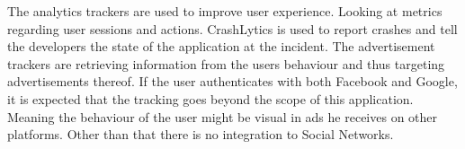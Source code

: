 The analytics trackers are used to improve user experience. Looking at metrics regarding user sessions and actions. CrashLytics is used to report crashes and tell the developers the state of the application at the incident. The advertisement trackers are retrieving information from the users behaviour and thus targeting advertisements thereof. If the user authenticates with both Facebook and Google, it is expected that the tracking goes beyond the scope of this application. Meaning the behaviour of the user might be visual in ads he receives on other platforms. Other than that there is no integration to Social Networks.       